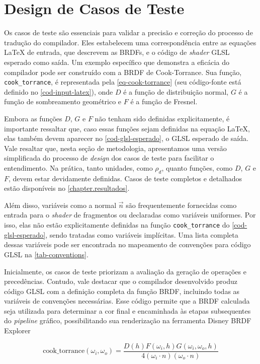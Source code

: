 \section{Design de Casos de Teste} \label{testes}
%
%
Os casos de teste são essenciais para validar a precisão e correção do processo de tradução do compilador. Eles estabelecem uma correspondência entre as equações \LaTeX{} de entrada, que descrevem as BRDFs, e o código de \textit{shader} GLSL esperado como saída. Um exemplo específico que demonstra a eficácia do compilador pode ser construído com a BRDF de Cook-Torrance. Sua função, \texttt{cook\_torrance}, é representada pela \autoref{eq-cook-torrance} (seu código-fonte está definido no \autoref{cod-input-latex}), onde \(D\) é a função de distribuição normal, \(G\) é a função de sombreamento geométrico e \(F\) é a função de Fresnel.


Embora as funções \(D\), \(G\) e \(F\) não tenham sido definidas explicitamente, é importante ressaltar que, caso essas funções sejam definidas na equação \LaTeX{}, elas também devem aparecer no \autoref{cod-glsl-esperado}, o GLSL esperado de saída. Vale resaltar que, nesta seção de metodologia, apresentamos uma versão simplificada do processo de \textit{design} dos casos de teste para facilitar o entendimento. Na prática, tanto unidades, como $\rho_d$, quanto funções, como \(D\), \(G\) e \(F\), devem estar devidamente definidas. Casos de teste completos e detalhados estão disponíveis no \autoref{chapter.resultados}.


Além disso, variáveis como a normal \( \vec{n} \) são frequentemente fornecidas como entrada para o \textit{shader} de fragmentos ou declaradas como variáveis uniformes. Por isso, elas não estão explicitamente definidas na função \texttt{cook\_torrance} do \autoref{cod-glsl-esperado}, sendo tratadas como variáveis implícitas. Uma lista completa dessas variáveis pode ser encontrada no mapeamento de convenções para código GLSL na \autoref{tab-conventions}.

Inicialmente, os casos de teste priorizam a avaliação da geração de operações e precedências. Contudo, vale destacar que o compilador desenvolvido produz código GLSL com a definição completa da função BRDF, incluindo todas as variáveis de convenções necessárias. Esse código permite que a BRDF calculada seja utilizada para determinar a cor final e encaminhada às etapas subsequentes do \textit{pipeline} gráfico, possibilitando sua renderização na ferramenta Disney BRDF Explorer


\begin{equation} \label{eq-cook-torrance}
  \text{cook\_torrance}(\omega_i, \omega_o) = \frac{D(h)F(\omega_i, h)G(\omega_i, \omega_o, h)}{4(\omega_i \cdot n)(\omega_o \cdot n)}
\end{equation}


